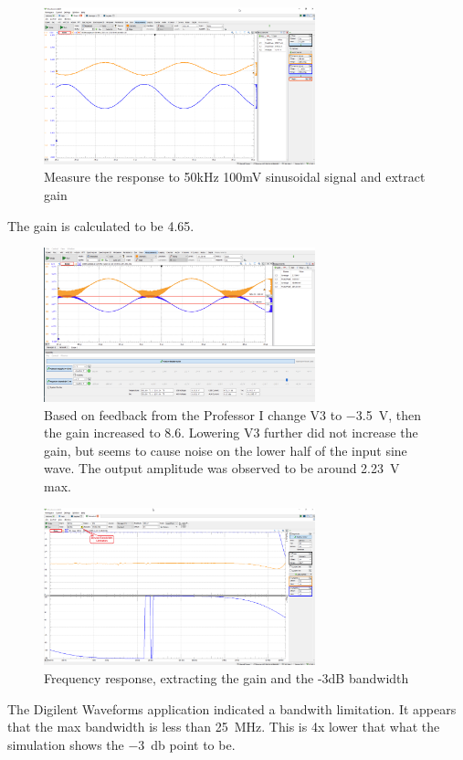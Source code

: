 \documentclass{article}
\begin{document}
	\begin{figure}[H]
	    \centering
	    \includegraphics[width=0.7\textwidth]{4a}
	    \caption{Measure the response to 50kHz 100mV sinusoidal signal and extract gain}
	\end{figure}	
	
	The gain is calculated to be 4.65.
	

	
	\begin{figure}[H]
	    \centering
	    \includegraphics[width=0.7\textwidth]{image}
	    \caption{	Based on feedback from the Professor  I change V3 to \SI{-3.5}{\volt}, then the gain increased to 8.6. Lowering V3 further did not increase the gain, but seems to cause noise on the lower half of the input sine wave. The output amplitude was observed to be around \SI{2.23}{\volt} max.}
	\end{figure}	
	
	\begin{figure}[H]
	    \centering
	    \includegraphics[width=0.7\textwidth]{4b}
	    \caption{Frequency response, extracting the gain and the -3dB bandwidth}
	\end{figure}	
	
	The Digilent Waveforms application indicated a bandwith limitation. It appears that the max bandwidth is less than \SI{25}{\mega\hertz}. This is 4x lower that what the simulation shows the \SI{-3}{\decibel} point to be. 
	
	
	
		
\end{document}
